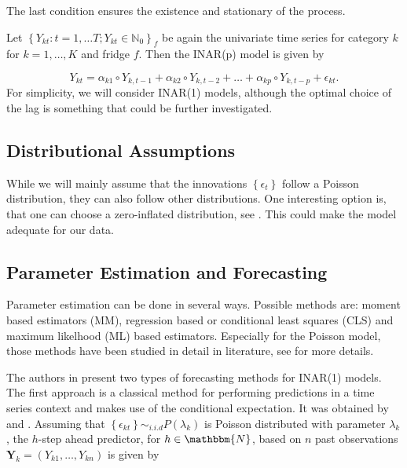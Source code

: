 The last condition ensures the existence and stationary of the process. 

Let $\left\{Y_{kt}:t=1,\ldots T; Y_{kt} \in \mathbb{N}_0\right\}_f$ be again the univariate time series for category $k$ for $k=1,\ldots,K$ and fridge $f$. Then the INAR(p) model is given by

\begin{equation}
Y_{kt} = \alpha_{k1} \circ Y_{k,t-1} + \alpha_{k2} \circ Y_{k,t-2} + \ldots + \alpha_{kp} \circ Y_{k,t-p} +\epsilon_{kt}.
\label{eq:Inar(p) model ts}
\end{equation}
%
For simplicity, we will consider INAR(1) models, although the optimal choice of the lag is something that could be further investigated. 

\subsection{Distributional Assumptions}
\label{sec: Inar Distributional assumptions}

While we will mainly assume that the innovations $\left\{\epsilon_t\right\}$ follow a Poisson distribution, they can also follow other distributions. One interesting option is, that one can choose a zero-inflated distribution, see \textcite{Garay:2022}. This could make the model adequate for our data. 


\subsection{Parameter Estimation and Forecasting}
\label{sec: Inar Parameter Estimation and Forecasting}

Parameter estimation can be done in several ways. Possible methods are: moment based estimators (MM), regression based or conditional least squares (CLS) and maximum likelhood (ML) based estimators. Especially for the Poisson model, those methods have been studied in detail in literature, see \textcite{Silva:2005} for more details. 

The authors in \textcite{Silva:2005} present two types of forecasting methods for INAR(1) models. The first approach is a classical method for performing predictions in a time series context and makes use of the conditional expectation. It was obtained by \textcite{Bre:1993} and \textcite{Freeland:2004}. Assuming that $\left\{\epsilon_{kt}\right\} \sim_{i.i.d} P(\lambda_k)$ is Poisson distributed with parameter $\lambda_k$, the $h$-step ahead predictor, for $h\in \mathbbm{N}$, based on $n$ past observations $\bm{Y}_k=(Y_{k1},\ldots,Y_{kn})$ is given by


